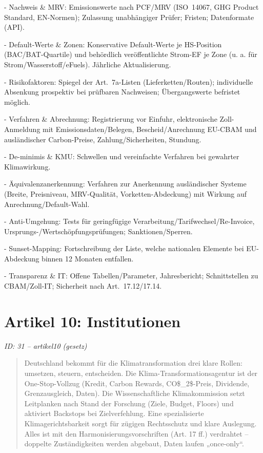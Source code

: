 \documentclass[12pt,a4paper]{scrartcl}
\begin{document}
- Nachweis \& MRV: Emissionswerte nach PCF/MRV (ISO 14067, GHG Product Standard, EN-Normen); Zulassung unabhängiger Prüfer; Fristen; Datenformate (API).

- Default-Werte \& Zonen: Konservative Default-Werte je HS-Position (BAC/BAT-Quartile) und behördlich veröffentlichte Strom-EF je Zone (u. a. für Strom/Wasserstoff/eFuels). Jährliche Aktualisierung.

- Risikofaktoren: Spiegel der Art. 7a-Listen (Lieferketten/Routen); individuelle Absenkung prospektiv bei prüfbaren Nachweisen; Übergangswerte befristet möglich.

- Verfahren \& Abrechnung: Registrierung vor Einfuhr, elektronische Zoll-Anmeldung mit Emissionsdaten/Belegen, Bescheid/Anrechnung EU-CBAM und ausländischer Carbon-Preise, Zahlung/Sicherheiten, Stundung.

- De-minimis \& KMU: Schwellen und vereinfachte Verfahren bei gewahrter Klimawirkung.

- Äquivalenzanerkennung: Verfahren zur Anerkennung ausländischer Systeme (Breite, Preisniveau, MRV-Qualität, Vorketten-Abdeckung) mit Wirkung auf Anrechnung/Default-Wahl.

- Anti-Umgehung: Tests für geringfügige Verarbeitung/Tarifwechsel/Re-Invoice, Ursprungs-/Wertschöpfungsprüfungen; Sanktionen/Sperren.

- Sunset-Mapping: Fortschreibung der Liste, welche nationalen Elemente bei EU-Abdeckung binnen 12 Monaten entfallen.

- Transparenz \& IT: Offene Tabellen/Parameter, Jahresbericht; Schnittstellen zu CBAM/Zoll-IT; Sicherheit nach Art. 17.12/17.14.


\section[Artikel 10: Institutionen]{Artikel 10: Institutionen}
\noindent\textit{ID: 31 -- artikel10 (gesetz)}

\begin{quote}
Deutschland bekommt für die Klimatransformation drei klare Rollen: umsetzen, steuern, entscheiden. Die Klima-Transformationsagentur ist der One-Stop-Vollzug (Kredit, Carbon Rewards, CO\$\_2\$-Preis, Dividende, Grenzausgleich, Daten). Die Wissenschaftliche Klimakommission setzt Leitplanken nach Stand der Forschung (Ziele, Budget, Floors) und aktiviert Backstops bei Zielverfehlung. Eine spezialisierte Klimagerichtsbarkeit sorgt für zügigen Rechtsschutz und klare Auslegung. Alles ist mit den Harmonisierungsvorschriften (Art. 17 ff.) verdrahtet -- doppelte Zuständigkeiten werden abgebaut, Daten laufen „once-only“.
\end{quote}
\end{document}
